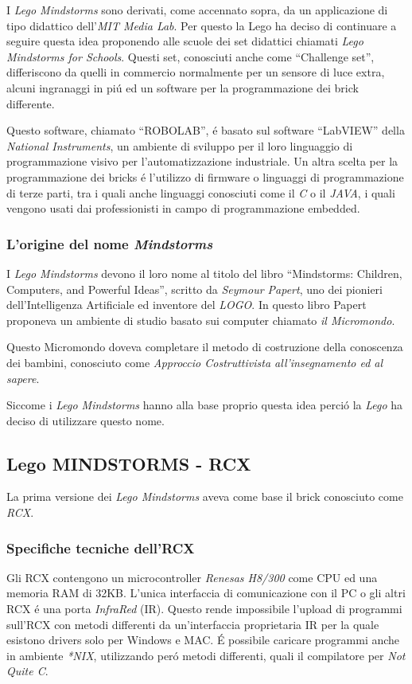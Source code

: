 I \emph{Lego Mindstorms} sono derivati, come accennato sopra, da un applicazione 
di tipo didattico dell'\emph{MIT Media Lab}. Per questo la Lego ha deciso
di continuare a seguire questa idea proponendo alle scuole dei set
didattici chiamati \emph{Lego Mindstorms for Schools}. Questi set,
conosciuti anche come ``Challenge set'', differiscono da quelli in
commercio normalmente per un sensore di luce extra, alcuni ingranaggi in
pi\'u ed un software per la programmazione dei brick differente.

Questo software, chiamato ``ROBOLAB'', \'e basato sul software ``LabVIEW''
della \emph{National Instruments}, un ambiente di sviluppo per il
loro linguaggio di programmazione visivo per l'automatizzazione
industriale. Un altra scelta per la programmazione dei bricks \'e
l'utilizzo di firmware o linguaggi di programmazione di terze parti, tra i
quali anche linguaggi conosciuti come il \emph{C} o il \emph{JAVA}, i quali
vengono usati dai professionisti in campo di programmazione embedded.

\subsubsection{L'origine del nome \emph{Mindstorms}}
I \emph{Lego Mindstorms} devono il loro nome al titolo del libro
``Mindstorms: Children, Computers, and Powerful Ideas''\cite{bib:mindbook},
scritto da \emph{Seymour Papert}, uno dei pionieri dell'Intelligenza
Artificiale ed inventore del \emph{LOGO}. In questo libro Papert proponeva
un ambiente di studio basato sui computer chiamato \emph{il Micromondo}.

Questo Micromondo doveva completare il metodo di costruzione della
conoscenza dei bambini, conosciuto come \emph{Approccio Costruttivista
all'insegnamento ed al sapere}.

Siccome i \emph{Lego Mindstorms} hanno alla base proprio questa idea
perci\'o la \emph{Lego} ha deciso di utilizzare questo
nome\cite{bib:mindbarticle}.

\subsection{Lego MINDSTORMS - RCX}
La prima versione dei \emph{Lego Mindstorms} aveva come base il brick
conosciuto come \emph{RCX}.

\subsubsection{Specifiche tecniche dell'RCX}
Gli RCX contengono un microcontroller 
\emph{Renesas H8/300} come CPU ed una memoria RAM di 32KB. L'unica
interfaccia di comunicazione con il PC o gli altri RCX \'e una porta
\emph{InfraRed} (IR). Questo rende impossibile l'upload di programmi
sull'RCX con metodi differenti da un'interfaccia proprietaria IR per la
quale esistono drivers solo per Windows e MAC. \'E possibile caricare
programmi anche in ambiente \emph{*NIX}, utilizzando per\'o metodi
differenti, quali il compilatore per \emph{Not Quite C}.

